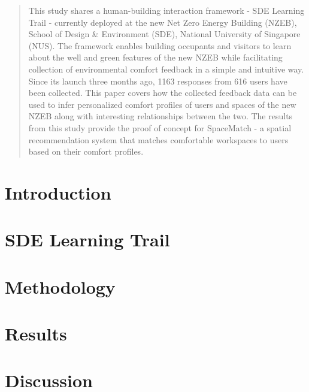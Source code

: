 \documentclass[a4paper]{jpconf} %
\begin{document}
\begin{abstract}

This study shares a human-building interaction framework - SDE Learning Trail - currently deployed at the new Net Zero Energy Building (NZEB), School of Design \& Environment (SDE), National University of Singapore (NUS). The framework enables building occupants and visitors to learn about the well and green features of the new NZEB while facilitating collection of environmental comfort feedback in a simple and intuitive way. Since its launch three months ago, 1163 responses from 616 users have been collected. This paper covers how the collected feedback data can be used to infer personalized comfort profiles of users and spaces of the new NZEB along with interesting relationships between the two. The results from this study provide the proof of concept for SpaceMatch - a spatial recommendation system that matches comfortable workspaces to users based on their comfort profiles.


\end{abstract}



\section{Introduction}
\label{ch:introduction}


\section{SDE Learning Trail}
\label{ch:SDELT}


\section{Methodology}
\label{ch:method}


\section{Results}
\label{ch:results}



\section{Discussion}
\label{ch:discussion}

\end{document}

